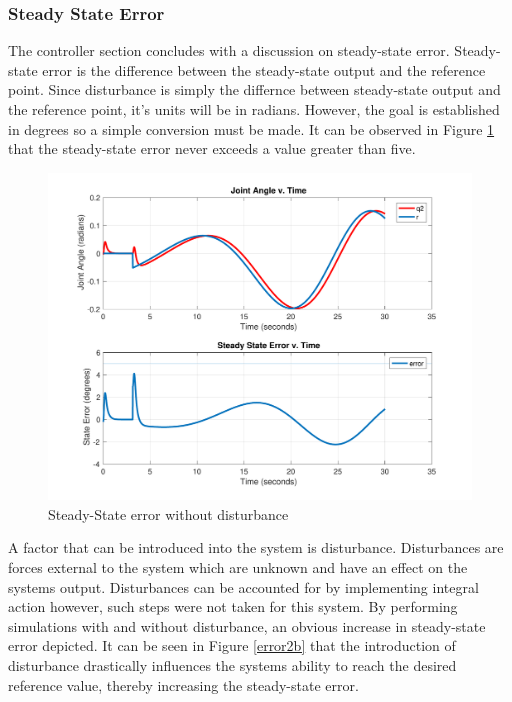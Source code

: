 \documentclass[12pt]{article}
\begin{document}
\subsubsection{Steady State Error}
The controller section concludes with a discussion on steady-state error. Steady-state error is the difference between the steady-state output and the reference point. Since disturbance is simply the differnce between steady-state output and the reference point, it's units will be in radians. However, the goal is established in degrees so a simple conversion must be made. It can be observed in Figure \ref{error2a} that the steady-state error never exceeds a value greater than five.
\begin{figure}[h!]
\centering
\includegraphics[width=1\textwidth]{StateErrorNormal.pdf}
\caption{Steady-State error without disturbance}
\label{error2a}
\end{figure}
\clearpage A factor that can be introduced into the system is disturbance. Disturbances are forces external to the system which are unknown and have an effect on the systems output. Disturbances can be accounted for by implementing integral action however, such steps were not taken for this system. By performing simulations with and without disturbance, an obvious increase in steady-state error depicted. It can be seen in Figure \ref{error2b} that the introduction of disturbance drastically influences the systems ability to reach the desired reference value, thereby increasing the steady-state error.
\end{document}
